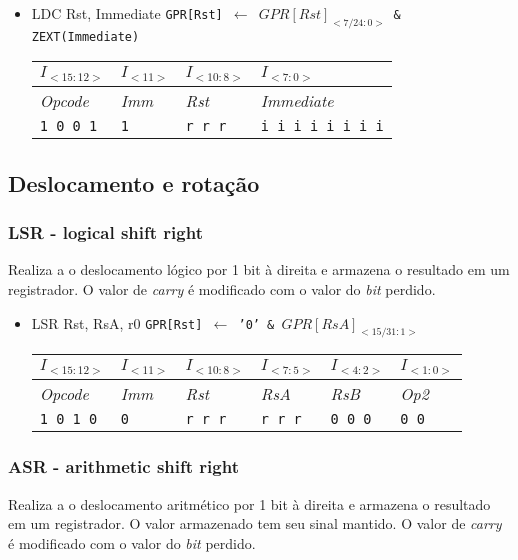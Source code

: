 \documentclass{extreport}
\begin{document}
\begin{itemize}
\item LDC Rst, Immediate
\subitem \texttt{GPR[Rst] $\leftarrow$ $GPR[Rst]_{<7/24:0>}$ \& ZEXT(Immediate)}
\begin{table}[ht!]
\centering
\begin{tabular}{|p{1.6cm}|p{1.6cm}|p{1.6cm}|p{5.65cm}|}
\hline
$I_{<15:12>}$ & $I_{<11>}$ & $I_{<10:8>}$ & $I_{<7:0>}$ \\ \hline
\textit{Opcode} & \textit{Imm} & \textit{Rst} & \textit{Immediate} \\ \hline
\texttt{1 0 0 1} & \texttt{1} & \texttt{r r r} & \texttt{i i i i i i i i} \\ \hline
\end{tabular}
\end{table}
\end{itemize}

\subsection{Deslocamento e rotação}
\subsubsection{LSR - logical shift right}
Realiza a o deslocamento lógico por 1 bit à direita e armazena o resultado em um registrador. O valor de \textit{carry} é modificado com o valor do \textit{bit} perdido.

\begin{itemize}
\item LSR Rst, RsA, r0
\subitem \texttt{GPR[Rst] $\leftarrow$ '0' \& $GPR[RsA]_{<15/31:1>}$}
\begin{table}[ht!]
\centering
\begin{tabular}{|p{1.6cm}|p{1.6cm}|p{1.6cm}|p{1.6cm}|p{1.6cm}|p{1.6cm}|}
\hline
$I_{<15:12>}$ & $I_{<11>}$ & $I_{<10:8>}$ & $I_{<7:5>}$ & $I_{<4:2>}$ & $I_{<1:0>}$ \\ \hline
\textit{Opcode} & \textit{Imm} & \textit{Rst} & \textit{RsA} & \textit{RsB} & \textit{Op2} \\ \hline
\texttt{1 0 1 0} & \texttt{0} & \texttt{r r r} & \texttt{r r r} & \texttt{0 0 0} & \texttt{0 0} \\ \hline
\end{tabular}
\end{table}
\end{itemize}

\subsubsection{ASR - arithmetic shift right}
Realiza a o deslocamento aritmético por 1 bit à direita e armazena o resultado em um registrador. O valor armazenado tem seu sinal mantido. O valor de \textit{carry} é modificado com o valor do \textit{bit} perdido.
\end{document}
